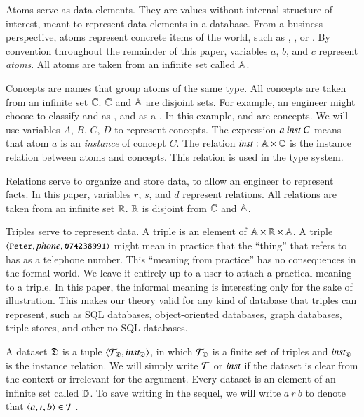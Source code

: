 \documentclass{elsarticle}
\begin{document}
   Atoms serve as data elements.
   They are values without internal structure of interest, meant to represent data elements in a database.
   From a business perspective, atoms represent concrete items of the world,
   such as , , or .
   By convention throughout the remainder of this paper, variables $a$, $b$, and $c$ represent \emph{atoms}.
   All atoms are taken from an infinite set called $\mathbb{A}$.
   
   Concepts are names that group atoms of the same type.
   All concepts are taken from an infinite set $\mathbb{C}$.
   $\mathbb{C}$ and $\mathbb{A}$ are disjoint sets.
   For example, an engineer might choose to classify  and  as ,
   and  as a .
   In this example,  and  are concepts.
   We will use variables $A$, $B$, $C$, $D$ to represent concepts.
   The expression $a\ \inst\ C$ means that atom $a$ is an \emph{instance} of concept $C$.
   The relation $\text{\it inst\/}:\mathbb{A}\times\mathbb{C}$ is the instance relation between atoms and concepts.
   This relation is used in the type system.
   
   Relations serve to organize and store data, to allow an engineer to represent facts.
   In this paper, variables $r$, $s$, and $d$ represent relations.
   All relations are taken from an infinite set $\mathbb{R}$.
   $\mathbb{R}$ is disjoint from $\mathbb{C}$ and $\mathbb{A}$.

   Triples serve to represent data.
   A triple is an element of $\mathbb{A}\times\mathbb{R}\times\mathbb{A}$.
   A triple $\langle{\text{{\tt\small Peter}}},{\text{\it phone\/}},{\text{{\tt\small 074238991}}}\rangle$ might mean in practice that
   the ``thing'' that  refers to has  as a telephone number.
   This ``meaning from practice'' has no consequences in the formal world.
   We leave it entirely up to a user to attach a practical meaning to a triple.
   In this paper, the informal meaning is interesting only for the sake of illustration.
   This makes our theory valid for any kind of database that triples can represent,
   such as SQL databases, object-oriented databases, graph databases, triple stores, and other no-SQL databases.
   
   A dataset $\mathfrak{D}$ is a tuple $\langle{\mathcal{T}_{\mathfrak{D}}},{\text{\it inst\/}_{\mathfrak{D}}}\rangle$,
   in which $\mathcal{T}_{\mathfrak{D}}$ is a finite set of triples
   and $\text{\it inst\/}_{\mathfrak{D}}$ is the instance relation.
   We will simply write $\mathcal{T}$ or $\text{\it inst\/}$ if the dataset is clear from the context or irrelevant for the argument.
   Every dataset is an element of an infinite set called $\mathbb{D}$.
   To save writing in the sequel, we will write $a\ r\ b$ to denote that $\langle{a},{r},{b}\rangle\in\mathcal{T}$.
\end{document}
